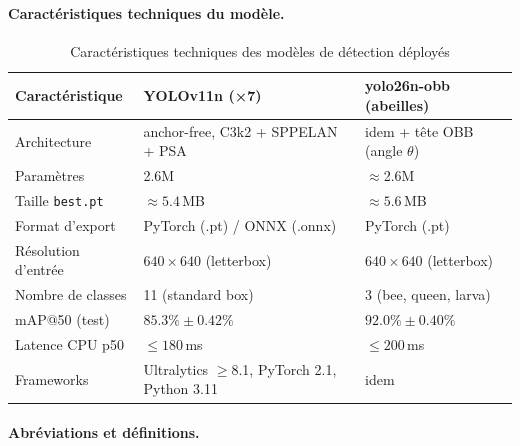 \paragraph{Caractéristiques techniques du modèle.}

\begin{table}[H]
\centering
\caption{Caractéristiques techniques des modèles de détection déployés}
\label{tab:model_techspecs}
\begin{tabular}{lll}
\toprule
\textbf{Caractéristique} & \textbf{YOLOv11n (×7)} & \textbf{yolo26n-obb (abeilles)} \\
\midrule
Architecture            & anchor-free, C3k2 + SPPELAN + PSA & idem + tête OBB (angle $\theta$) \\
Paramètres              & 2.6M & $\approx$2.6M \\
Taille \texttt{best.pt} & $\approx 5.4$\,MB & $\approx 5.6$\,MB \\
Format d'export         & PyTorch (.pt) / ONNX (.onnx) & PyTorch (.pt) \\
Résolution d'entrée     & $640 \times 640$ (letterbox) & $640 \times 640$ (letterbox) \\
Nombre de classes       & 11 (standard box) & 3 (bee, queen, larva) \\
mAP@50 (test)           & $85.3\% \pm 0.42\%$ & $92.0\% \pm 0.40\%$ \\
Latence CPU p50         & $\leq 180$\,ms & $\leq 200$\,ms \\
Frameworks              & Ultralytics $\geq$8.1, PyTorch 2.1, Python 3.11 & idem \\
\bottomrule
\end{tabular}
\end{table}

\paragraph{Abréviations et définitions.}

